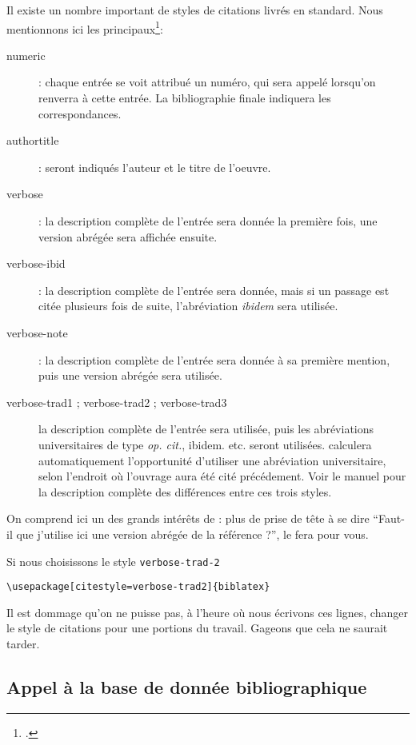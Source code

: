 Il existe un nombre important de styles de citations livrés en standard. Nous mentionnons ici les principaux\footcite[Se reporter à][pour plus de détails.]{biblatex_style}:
\begin{description}
\item[numeric] : chaque entrée se voit attribué un numéro, qui sera appelé lorsqu'on renverra à cette entrée. La bibliographie finale indiquera les correspondances.
\item[authortitle] : seront indiqués l'auteur et le titre de l'oeuvre.
\item[verbose]    : la description complète de l'entrée sera donnée la première fois, une version abrégée sera affichée ensuite.
\item[verbose-ibid] : la description complète de l'entrée sera donnée, mais si un passage est citée plusieurs fois de suite, l'abréviation \emph{ibidem} sera utilisée.
\item[verbose-note] : la description complète de l'entrée sera donnée à sa première mention, puis une version abrégée sera utilisée.
\item[verbose-trad1 ; verbose-trad2 ; verbose-trad3] la description complète de l'entrée sera utilisée, puis les abréviations universitaires de type \emph{op. cit.}, {ibidem.} etc. seront utilisées.  calculera automatiquement l'opportunité d'utiliser une abréviation universitaire, selon l'endroit où l'ouvrage aura été cité précédement. Voir le manuel pour la description complète des différences entre ces trois styles.
\end{description}

On comprend ici un des grands intérêts de \logiciel{\LaTeX} : plus de prise de tête à se dire \enquote{Faut-il que j'utilise ici une version abrégée de la référence ?},  le fera pour vous.

Si nous choisissons le style \verb|verbose-trad-2|
\begin{verbatim}
\usepackage[citestyle=verbose-trad2]{biblatex}
\end{verbatim}

Il est dommage qu'on ne puisse pas, à l'heure où nous écrivons ces lignes, changer le style de citations pour une portions du travail. Gageons que cela ne saurait tarder.

\subsection{Appel à la base de donnée bibliographique}

